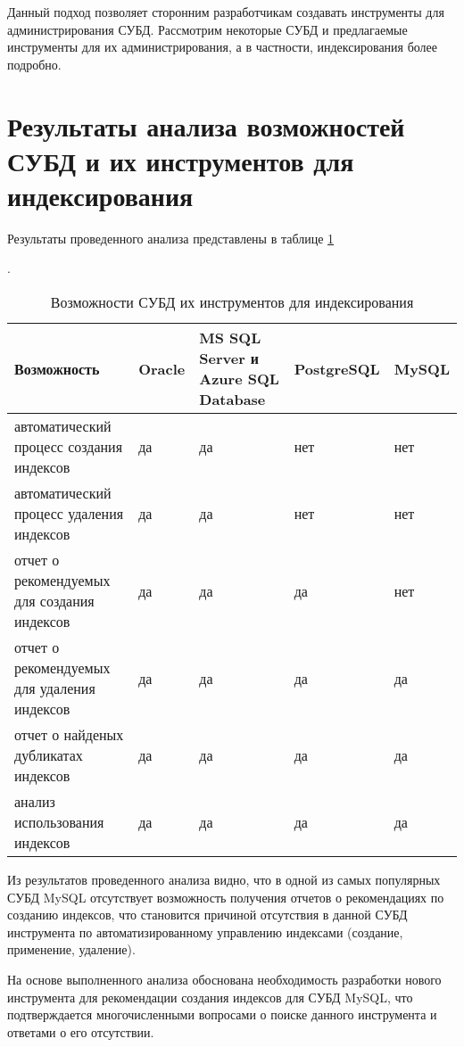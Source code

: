 Данный подход позволяет сторонним разработчикам создавать инструменты для администрирования СУБД. Рассмотрим некоторые СУБД и предлагаемые инструменты для их администрирования, а в частности, индексирования более подробно.









\section{Результаты анализа возможностей СУБД и их инструментов для индексирования}

Результаты проведенного анализа представлены в таблице  \ref{table:dbms_and_tools_for_indexes}

\begin{table}[h]
\caption{Возможности СУБД их инструментов для индексирования}\label{table:dbms_and_tools_for_indexes}.
\medskip
\begin{tabular}{|p{4cm}|p{2cm}|p{2cm}|p{2cm}|p{2cm}|}
\hline
Возможность & Oracle & MS SQL Server и Azure SQL Database & PostgreSQL & MySQL\\
\hline
автоматический процесс создания индексов & да & да & нет & нет\\
\hline
автоматический процесс удаления индексов & да & да & нет & нет\\
\hline
отчет о рекомендуемых для создания индексов & да & да & да & нет\\
\hline
отчет о рекомендуемых для удаления индексов & да & да & да & да\\
\hline
отчет о найденых дубликатах индексов & да & да & да & да\\
\hline
анализ использования индексов & да & да & да & да\\
\hline
\end{tabular}
\end{table}

Из результатов проведенного анализа видно, что в одной из самых популярных СУБД MySQL отсутствует возможность получения отчетов о рекомендациях по созданию индексов, что становится причиной отсутствия в данной СУБД инструмента по автоматизированному управлению индексами (создание, применение, удаление).

На основе выполненного анализа обоснована необходимость разработки нового инструмента для рекомендации создания индексов для СУБД MySQL, что подтверждается многочисленными вопросами о поиске данного инструмента и ответами о его отсутствии. \cite{stackoverflow.com:as_mssql_tuning_advisor,stackoverflow.com:automatic-index-creation,stackoverflow.com:help-me-optimise-my-queries-and-index-settings,stackoverflow.com:auto-build-indexes,experts-exchange.com:as_engine_tuning_advisor} 

